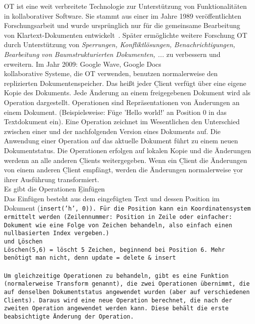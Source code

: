 \gls{OT} ist eine weit verbreitete Technologie zur Unterstützung von Funktionalitäten in \gls{kollaborativ}er Software. Sie stammt aus einer im Jahre 1989 veröffentlichten Forschungsarbeit und wurde ursprünglich nur für die gemeinsame Bearbeitung von Klartext-Dokumenten entwickelt~\cite{ot_paper}. Später ermöglichte weitere Forschung \gls{OT} durch Unterstützung von \textit{Sperrungen, Konfliktlösungen, Benachrichtigungen, Bearbeitung von Baumstrukturierten Dokumenten, ...} zu verbessern und erweitern. Im Jahr 2009: Google Wave, Google Docs\\
\Gls{kollaborativ}e Systeme, die \gls{OT} verwenden, benutzen normalerweise den replizierten Dokumentenspeicher. Das heißt jeder \b{Client} verfügt über eine eigene Kopie des Dokuments.
Jede Änderung an einem freigegebenen Dokument wird als Operation dargestellt. Operationen sind Repräsentationen von Änderungen an einem Dokument. (Beispielsweise: Füge 'Hello world!' an Position 0 in das Textdokument ein).  Eine Operation zeichnet im Wesentlichen den Unterschied zwischen einer und der nachfolgenden Version eines Dokuments auf. Die Anwendung einer Operation auf das aktuelle Dokument führt zu einem neuen Dokumentstatus.
Die Operationen erfolgen auf lokalen Kopie und die Änderungen werdenn an alle anderen \b{Clients} weitergegeben.  Wenn ein \b{Client} die Änderungen von einem anderen \b{Client} empfängt, werden die Änderungen normalerweise \b{vor} ihrer Ausführung transformiert.
\\
Es gibt die Operationen \b{Einfügen}\\
Das Einfügen besteht aus dem eingefügten Text und dessen Position im Dokument (\tt{insert('h', 0)}).
Für die Position kann ein Koordinatensystem ermittelt werden (Zeilennummer: Position in Zeile oder einfacher: Dokument wie eine Folge von Zeichen behandeln, also einfach einen nullbasierten Index vergeben.)\\
und \b{Löschen}\\
Löschen(5,6) = löscht 5 Zeichen, beginnend bei Position 6.
Mehr benötigt man nicht, denn update = delete \& insert\\\\
Um gleichzeitige Operationen zu behandeln, gibt es eine Funktion (normalerweise \texttt{Transform} genannt), die zwei Operationen übernimmt, die auf denselben Dokumentstatus angewendet wurden (aber auf verschiedenen Clients).
Daraus wird eine neue Operation berechnet, die nach der zweiten Operation angewendet werden kann. Diese behält die erste beabsichtigte Änderung der Operation.

